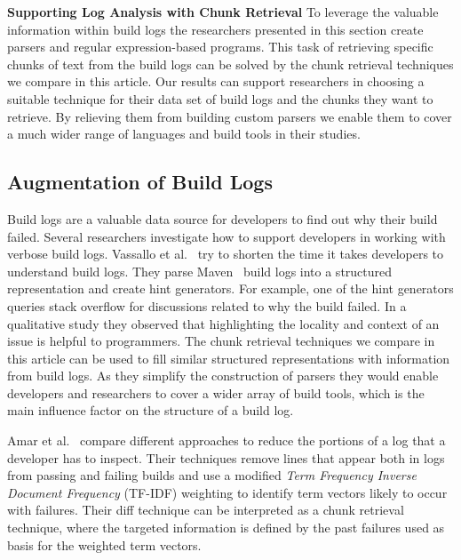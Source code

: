 \noindent
\textbf{Supporting Log Analysis with Chunk Retrieval}
To leverage the valuable information within build logs the researchers
presented in this section create parsers and regular expression-based
programs.
This task of retrieving specific chunks of text from the
build logs can be solved by the chunk retrieval techniques we compare
in this article.
Our results can support researchers in choosing a
suitable technique for their data set of build logs and the chunks
they want to retrieve.
By relieving them from building custom parsers
we enable them to cover a much wider range of languages and build
tools in their studies.


\subsection{Augmentation of Build Logs}
\label{sec:rw-bl-analysis}
Build logs are a valuable data source for developers to find out why
their build failed.
Several researchers investigate how to support
developers in working with verbose build logs.
Vassallo et
al.~\cite{vassallo2018un-break} try to shorten the time it takes
developers to understand build logs.
They parse
Maven~\cite{maven2019website} build logs into a structured
representation and create hint generators.
For example, one of the hint generators queries stack overflow for
discussions related to why the build failed.
In a qualitative study
they observed that highlighting the locality and context of an issue
is helpful to programmers.
The chunk retrieval techniques we compare in this article can be used
to fill similar structured representations with information from build
logs.
As they simplify the construction of parsers they would enable
developers and researchers to cover a wider array of build tools,
which is the main influence factor on the structure of a build log.

Amar et al.~\cite{amar2019mining} compare different approaches to
reduce the portions of a log that a developer has to inspect.
Their
techniques remove lines that appear both in logs from passing and
failing builds and use a modified \emph{Term Frequency Inverse
Document Frequency} (TF-IDF) weighting to identify term vectors likely
to occur with failures.
Their diff technique can be interpreted as a
chunk retrieval technique, where the targeted information is defined
by the past failures used as basis for the weighted term vectors.

